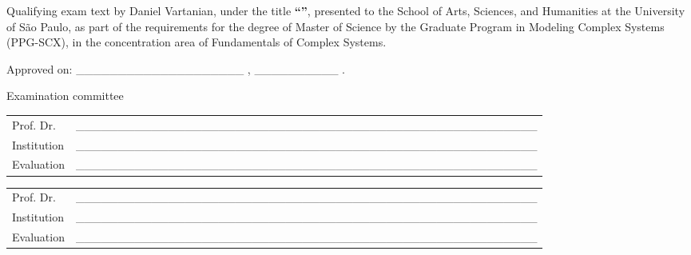 \begin{folhadeaprovacao}
\noindent
Qualifying exam text by Daniel Vartanian, under the title \textbf{``\imprimirtitulo''}, presented to the School of Arts, Sciences, and Humanities at the University of São Paulo, as part of the requirements for the degree of Master of Science by the Graduate Program in Modeling Complex Systems (PPG-SCX), in the concentration area of Fundamentals of Complex Systems.


\vspace*{1.5cm}

\noindent
Approved on: \_\_\_\_\_\_\_\_\_\_\_\_\_\_\_\_\_\_\_\_ , \_\_\_\_\_\_\_\_\_\_ .

\vspace*{1.5cm}

\begin{center}
Examination committee
\end{center}

\vspace*{0.5cm}

\renewcommand{\arraystretch}{2}
\noindent
\begin{tabular}{m{2cm} P{14cm}}
  Prof. Dr. & \_\_\_\_\_\_\_\_\_\_\_\_\_\_\_\_\_\_\_\_\_\_\_\_\_\_\_\_\_\_\_\_\_\_\_\_\_\_\_\_\_\_\_\_\_\_\_\_\_\_\_\_\_\_\_ \\
  Institution & \_\_\_\_\_\_\_\_\_\_\_\_\_\_\_\_\_\_\_\_\_\_\_\_\_\_\_\_\_\_\_\_\_\_\_\_\_\_\_\_\_\_\_\_\_\_\_\_\_\_\_\_\_\_\_ \\
  Evaluation & \_\_\_\_\_\_\_\_\_\_\_\_\_\_\_\_\_\_\_\_\_\_\_\_\_\_\_\_\_\_\_\_\_\_\_\_\_\_\_\_\_\_\_\_\_\_\_\_\_\_\_\_\_\_\_ \\
\end{tabular}

\vspace*{1cm}

\noindent
\begin{tabular}{m{2cm} P{14cm}}
  Prof. Dr. & \_\_\_\_\_\_\_\_\_\_\_\_\_\_\_\_\_\_\_\_\_\_\_\_\_\_\_\_\_\_\_\_\_\_\_\_\_\_\_\_\_\_\_\_\_\_\_\_\_\_\_\_\_\_\_ \\
  Institution & \_\_\_\_\_\_\_\_\_\_\_\_\_\_\_\_\_\_\_\_\_\_\_\_\_\_\_\_\_\_\_\_\_\_\_\_\_\_\_\_\_\_\_\_\_\_\_\_\_\_\_\_\_\_\_ \\
  Evaluation & \_\_\_\_\_\_\_\_\_\_\_\_\_\_\_\_\_\_\_\_\_\_\_\_\_\_\_\_\_\_\_\_\_\_\_\_\_\_\_\_\_\_\_\_\_\_\_\_\_\_\_\_\_\_\_ \\
\end{tabular}


\end{folhadeaprovacao}
